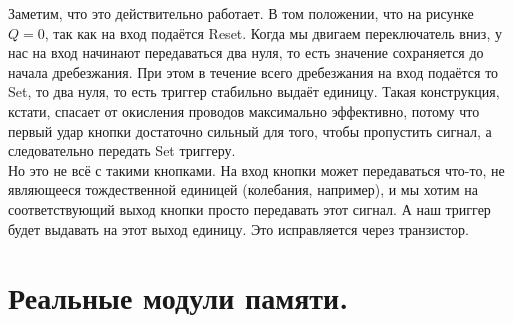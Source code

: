\documentclass{article}
\begin{document}
    Заметим, что это действительно работает. В том положении, что на рисунке $Q=0$, так как на вход подаётся Reset. Когда мы двигаем переключатель вниз, у нас на вход начинают передаваться два нуля, то есть значение сохраняется до начала дребезжания. При этом в течение всего дребезжания на вход подаётся то Set, то два нуля, то есть триггер стабильно выдаёт единицу. Такая конструкция, кстати, спасает от окисления проводов максимально эффективно, потому что первый удар кнопки достаточно сильный для того, чтобы пропустить сигнал, а следовательно передать Set триггеру.\\
    Но это не всё с такими кнопками. На вход кнопки может передаваться что-то, не являющееся тождественной единицей (колебания, например), и мы хотим на соответствующий выход кнопки просто передавать этот сигнал. А наш триггер будет выдавать на этот выход единицу. Это исправляется через транзистор.
    \begin{center}
    \end{center}
    \section{Реальные модули памяти.}
\end{document}
